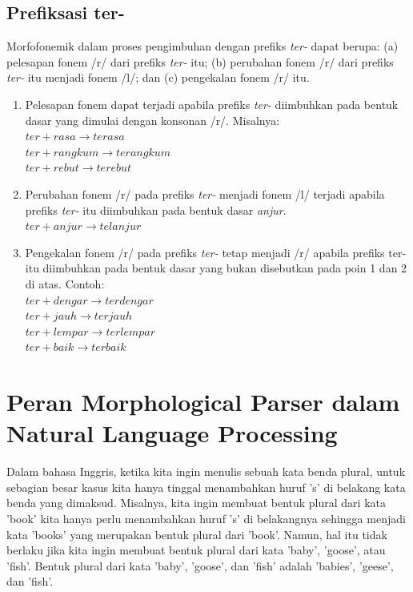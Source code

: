 \subsection{Prefiksasi ter-}
\label{sec:prefiksasiTer-}

Morfofonemik dalam proses pengimbuhan dengan prefiks \textit{ter-} dapat berupa: (a) pelesapan fonem /r/ dari prefiks \textit{ter-} itu; (b) perubahan fonem /r/ dari prefiks \textit{ter-} itu menjadi fonem /l/; dan (c) pengekalan fonem /r/ itu. 

\begin{enumerate}
	\item Pelesapan fonem dapat terjadi apabila prefiks \textit{ter-} diimbuhkan pada bentuk dasar yang dimulai dengan konsonan /r/. Misalnya:\\
	$ter + rasa \rightarrow terasa$\\
	$ter + rangkum \rightarrow terangkum$\\
	$ter + rebut \rightarrow terebut$
	
	\item Perubahan fonem /r/ pada prefiks \textit{ter-} menjadi fonem /l/ terjadi apabila prefiks \textit{ter-} itu diimbuhkan pada bentuk dasar \textit{anjur}.\\
	$ter + anjur \rightarrow telanjur$
	
	\item Pengekalan fonem /r/ pada prefiks \textit{ter-} tetap menjadi /r/ apabila prefiks ter- itu diimbuhkan pada bentuk dasar yang bukan disebutkan pada poin 1 dan 2 di atas. Contoh:\\
	$ter + dengar \rightarrow terdengar$\\	
	$ter + jauh \rightarrow terjauh$\\
	$ter + lempar \rightarrow terlempar$\\
	$ter + baik \rightarrow terbaik$
	
\end{enumerate}


\section{Peran Morphological Parser dalam Natural Language Processing\cite{jurafsky:09:nlp}}
\label{sec:peranParser}

Dalam bahasa Inggris, ketika kita ingin menulis sebuah kata benda plural, untuk sebagian besar kasus kita hanya tinggal menambahkan huruf 's' di belakang kata benda yang dimaksud. Misalnya, kita ingin membuat bentuk plural dari kata 'book' kita hanya perlu menambahkan huruf 's' di belakangnya sehingga menjadi kata 'books' yang merupakan bentuk plural dari 'book'. Namun, hal itu tidak berlaku jika kita ingin membuat bentuk plural dari kata 'baby', 'goose', atau 'fish'. Bentuk plural dari kata 'baby', 'goose', dan 'fish' adalah 'babies', 'geese', dan 'fish'. 

